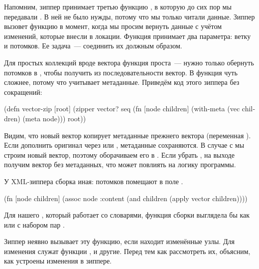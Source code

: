 
Напомним, зиппер принимает третью функцию , в которую до сих пор мы
передавали . В ней не было нужды, потому что мы только читали
данные. Зиппер вызовет функцию в момент, когда мы просим вернуть данные с учётом
изменений, которые внесли в локации. Функция принимает два параметра: ветку и
потомков. Ее задача~--- соединить их должным образом.

Для простых коллекций вроде вектора функция проста~--- нужно только обернуть
потомков в , чтобы получить из последовательности вектор. В 
функция чуть сложнее, потому что учитывает метаданные. Приведём код этого
зиппера без сокращений:


\begin{english}
  \begin{clojure/lines}
(defn vector-zip
  [root]
  (zipper vector?
          seq
          (fn [node children]
            (with-meta (vec children) (meta node)))
          root))
  \end{clojure/lines}
\end{english}

Видим, что новый вектор  копирует метаданные прежнего вектора
(переменная ). Если дополнить оригинал через  или
, метаданные сохраняются. В случае с  мы строим
новый вектор, поэтому оборачиваем его в . Если убрать
, на выходе получим вектор без метаданных, что может повлиять на
логику программы.

У XML-зиппера сборка иная: потомков помещают в поле .

\begin{english}
  \begin{clojure}
(fn [node children]
  (assoc node :content
              (and children (apply vector children))))
  \end{clojure}
\end{english}

Для нашего , который работает со словарями, функция сборки выглядела бы
как  или  с набором пар .


Зиппер неявно вызывает эту функцию, если находит изменённые узлы. Для изменения
служат функции ,  и другие. Перед тем как рассмотреть
их, объясним, как устроены изменения в зиппере.

